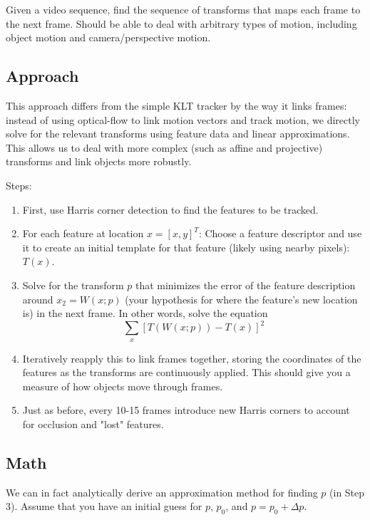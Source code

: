 \documentclass{article}
\begin{document}
Given a	video sequence,	find the sequence of transforms that maps each frame to the next frame. Should be able to deal with arbitrary types of motion, including object motion and camera/perspective motion.

\subsection{Approach}

This approach differs from the simple KLT tracker by the way it links frames: instead of using optical-flow to link motion vectors and track motion, we directly solve for the relevant transforms using feature data and linear approximations. This allows us to deal with more complex (such as affine and projective) transforms and link objects more robustly.

Steps:
\begin{enumerate}

\item{First, use Harris	corner detection to	find the features to be tracked.}

\item{For each feature at location $x= [x, y]^T$: Choose a feature descriptor and use it to create an initial template for that feature (likely using nearby pixels): $T(x)$.}

\item{Solve for the transform $p$ that minimizes the error of the feature description around $x_2 = W(x;p)$ (your hypothesis for where the feature's new location is) in the next frame. In other words, solve the equation $$\sum_x {[T(W(x;p)) - T(x)]^2}$$}

\item{Iteratively reapply this to link frames together, storing the coordinates of the features as the transforms are continuously applied. This should give you a measure of how objects move through frames. }

\item{Just as before, every 10-15 frames introduce new Harris corners to account for occlusion and "lost" features.}

\end{enumerate}

\subsection{Math}

We can in fact analytically derive an approximation method for finding $p$ (in Step 3). Assume that you have an initial guess for $p$, $p_0$, and $p = p_0 + \Delta p$. 
\end{document}
